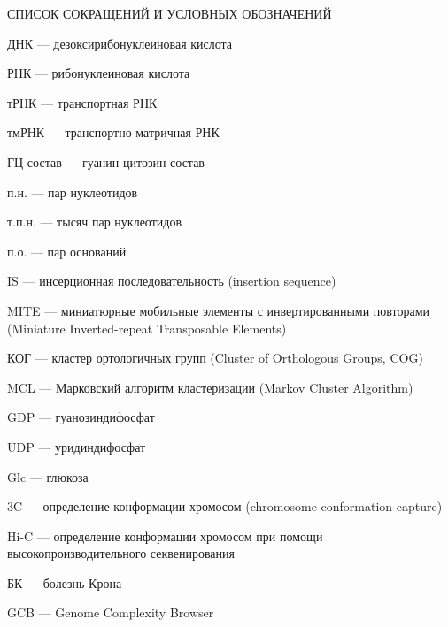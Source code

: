 \printnomenclature[3.5cm] %
СПИСОК СОКРАЩЕНИЙ И УСЛОВНЫХ ОБОЗНАЧЕНИЙ

ДНК --- дезоксирибонуклеиновая кислота

РНК --- рибонуклеиновая кислота

тРНК --- транспортная РНК

тмРНК --- транспортно-­матричная РНК

ГЦ-состав --- гуанин-цитозин состав

п.н. ---  пар нуклеотидов

т.п.н. ---  тысяч пар нуклеотидов

п.о. --- пар оснований

IS --- инсерционная последовательность (insertion sequence)

MITE --- миниатюрные мобильные элементы с инвертированными повторами (Miniature Inverted-repeat Transposable Elements)

КОГ --- кластер ортологичных групп (Cluster of Orthologous Groups, COG)

MCL --- Марковский алгоритм кластеризации (Markov Cluster Algorithm)

GDP --- гуанозиндифосфат

UDP --- уридиндифосфат

Glc --- глюкоза

3C --- определение конформации хромосом (chromosome conformation capture)

Hi-C --- определение конформации хромосом при помощи высокопроизводительного секвенирования

БК --- болезнь Крона

GCB --- Genome Complexity Browser
